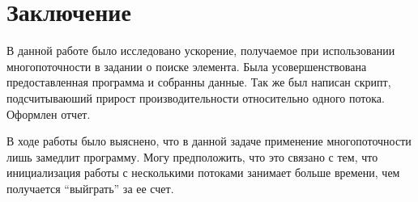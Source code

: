 \documentclass[a4paper, 12pt]{article}
\begin{document}




\section{Заключение}

В данной работе было исследовано ускорение, получаемое при использовании многопоточности в задании о поиске элемента.
Была усовершенствована предоставленная программа и собранны данные.
Так же был написан скрипт, подсчитываюший прирост производительности относительно одного потока.
Оформлен отчет.

В ходе работы было выяснено, что в данной задаче применение многопоточности лишь замедлит программу.
Могу предположить, что это связано с тем, что инициализация работы с несколькими потоками занимает больше времени, чем получается ``выйграть'' за ее счет.


\end{document}
